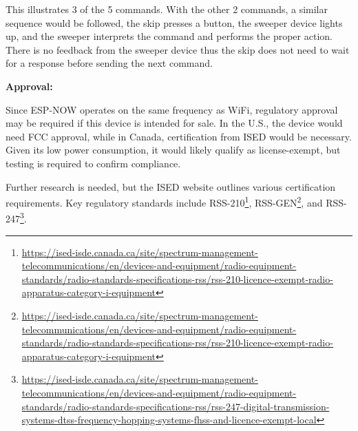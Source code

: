 \documentclass{article}
\begin{document}
This illustrates 3 of the 5 commands. With the other 2 commands, a similar sequence would be followed, the skip presses a button, the sweeper device lights up, and the sweeper interprets the command and performs the proper action. There is no feedback from the sweeper device thus the skip does not need to wait for a response before sending the next command.

\textbf{Approval:}

Since ESP-NOW operates on the same frequency as WiFi, regulatory approval may be required if this device is intended for sale. In the U.S., the device would need FCC approval, while in Canada, certification from ISED would be necessary. Given its low power consumption, it would likely qualify as license-exempt, but testing is required to confirm compliance.

Further research is needed, but the ISED website outlines various certification requirements. Key regulatory standards include RSS-210\footnote{\url{https://ised-isde.canada.ca/site/spectrum-management-telecommunications/en/devices-and-equipment/radio-equipment-standards/radio-standards-specifications-rss/rss-210-licence-exempt-radio-apparatus-category-i-equipment}}, RSS-GEN\footnote{\url{https://ised-isde.canada.ca/site/spectrum-management-telecommunications/en/devices-and-equipment/radio-equipment-standards/radio-standards-specifications-rss/rss-210-licence-exempt-radio-apparatus-category-i-equipment}}, and RSS-247\footnote{\url{https://ised-isde.canada.ca/site/spectrum-management-telecommunications/en/devices-and-equipment/radio-equipment-standards/radio-standards-specifications-rss/rss-247-digital-transmission-systems-dtss-frequency-hopping-systems-fhss-and-licence-exempt-local}}.



\end{document}
